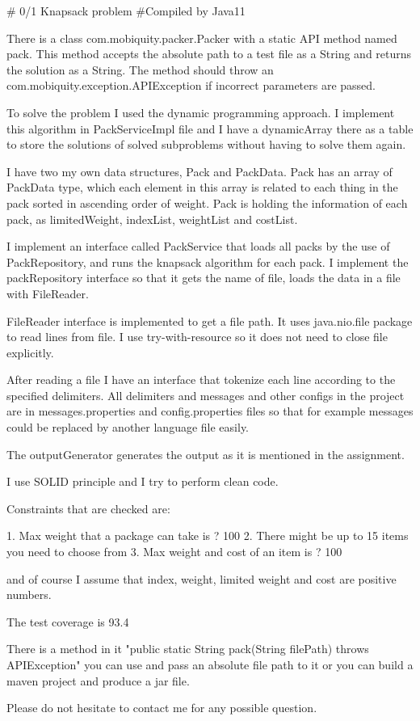 # 0/1 Knapsack problem
#Compiled by Java11

There is a class com.mobiquity.packer.Packer with a static API method named pack. This method accepts the absolute path to a test file as a String and returns the solution as a String. The method should throw an com.mobiquity.exception.APIException if incorrect parameters are passed.

To solve the problem I used the dynamic programming approach. I implement this algorithm in PackServiceImpl file and I have a dynamicArray there as a table to store the solutions of solved subproblems without having to solve them again.

I have two my own data structures, Pack and PackData. Pack has an array of PackData type, which each element in this array is related to each thing in the pack sorted in ascending order of weight. Pack is holding the information of each pack, as limitedWeight, indexList, weightList and costList. 

I implement an interface called PackService that loads all packs by the use of PackRepository, and runs the knapsack algorithm for each pack. I implement the packRepository interface so that it gets the name of file, loads the data in a file with FileReader. 

FileReader interface is implemented to get a file path. It uses java.nio.file package to read lines from file. I use try-with-resource so it does not need to close file explicitly.

After reading a file I have an interface that tokenize each line according to the specified delimiters. All delimiters and messages and other configs in the project are in messages.properties and config.properties files so that for example messages could be replaced by another language file easily.

The outputGenerator generates the output as it is mentioned in the assignment.

I use SOLID principle and I try to perform clean code.

Constraints that are checked are:

1. Max weight that a package can take is ? 100
2. There might be up to 15 items you need to choose from
3. Max weight and cost of an item is ? 100

and of course I assume that index, weight, limited weight and cost are positive numbers.

The test coverage is 93.4

There is a method in it "public static String pack(String filePath) throws APIException" you can use and pass an absolute file path to it or you can build a maven project and produce a jar file.

Please do not hesitate to contact me for any possible question. 
